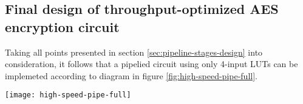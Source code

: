\subsection{Final design of throughput-optimized AES encryption circuit}
Taking all points presented in section \ref{sec:pipeline-stages-design} into consideration, it follows that a pipelied circuit using only 4-input LUTs can be implemeted according to diagram in figure \ref{fig:high-speed-pipe-full}.


\begin{sidewaysfigure}
\label{fig:high-speed-pipe-full}
\centering
\texttt{[image: high-speed-pipe-full]}
\caption{Throughput optimized AES encryption pipelined circuit}
\end{sidewaysfigure}


